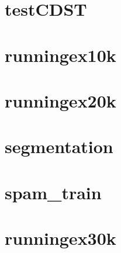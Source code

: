 \section{testCDST}
\label{sec:dataSets:testCDST}

\section{runningex10k}
\label{sec:dataSets:runningex10k}

\section{runningex20k}
\label{sec:dataSets:runningex20k}

\section{segmentation}
\label{sec:dataSets:segmentation}

\section{spam\_train}
\label{sec:dataSets:spam_train}

\section{runningex30k}
\label{sec:dataSets:runningex30k}

